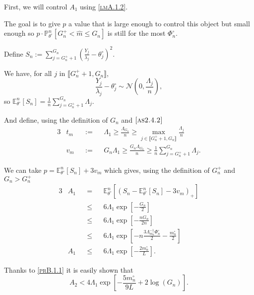 \medskip

First, we will control $A_{1}$ using \textsc{\cref{lmA.1.2}}.

The goal is to give $p$ a value that is large enough to control this object but small enough so $p \cdot \mathds{P}_{\theta^{\circ}}^{n} \left[G_{n}^{+} < \widehat{m} \leq G_{n}\right]$ is still for the most $\Phi_{n}^{\circ}$.

Define $S_{n} := \sum\limits_{j = G_{n}^{+} + 1}^{G_{n}}\left(\frac{Y_{j}}{\lambda_{j}} - \theta^{\circ}_{j}\right)^{2}.$

We have, for all $j$ in $\llbracket G_{n}^{+} + 1, G_{n} \rrbracket$,
\[ \frac{Y_{j}}{\lambda_{j}} - \theta^{\circ}_{j} \sim \mathcal{N}\left(0, \frac{\Lambda_{j}}{n} \right), \]
so $\mathds{E}_{\theta^{\circ}}^{n}\left[S_{n}\right] = \frac{1}{n} \sum\limits_{j = G_{n}^{+} + 1}^{G_{n}} \Lambda_{j}$.

And define, using the definition of $G_{n}$ and $\textsc{\cref{as2.4.2}}$
\begin{alignat*}{3}
& t_{m} &&:=&& \Lambda_{1} \geq \frac{\Lambda_{G_{n}}}{n} \geq \max\limits_{j \in \llbracket G_{n}^{+} + 1, G_{n} \rrbracket} \frac{\Lambda_{j}}{n}\\
& v_{m} && := && G_{n} \Lambda_{1} \geq \frac{G_{n} \Lambda_{G_{n}}}{n} \geq  \frac{1}{n} \sum\limits_{j = G_{n}^{+} + 1}^{G_{n}} \Lambda_{j}.
\end{alignat*}

We can take $p = \mathds{E}_{\theta^{\circ}}^{n}\left[S_{n}\right] + 3 v_{m}$ which gives, using the definition of $G_{n}^{+}$ and $G_{n} > G_{n}^{+}$
\begin{alignat*}{3}
& A_{1} && = && \mathds{E}_{\theta^{\circ}}^{n}\left[\left(S_{n} - \mathds{E}_{\theta^{\circ}}^{n}\left[S_{n}\right] - 3 v_{m}\right)_{+}\right]\\
& &&\leq&& 6 \Lambda_{1} \exp\left[- \frac{G_{n}}{2}\right]\\
& &&\leq&& 6 \Lambda_{1} \exp\left[- \frac{n G_{n}}{2n}\right]\\
& &&\leq&& 6 \Lambda_{1} \exp\left[- n \frac{3 \Lambda_{m_{n}^{\circ}}^{-1} \Phi_{n}^{\circ}}{2} - \frac{m_{n}^{\circ}}{2}\right]\\
& A_{1} && \leq && 6 \Lambda_{1} \exp\left[- \frac{2 m_{n}^{\circ}}{L}\right].
\end{alignat*}

\medskip

Thanks to \textsc{\cref{prB.1.1}} it is easily shown that
\[A_{2} < 4 \Lambda_{1} \exp\left[-\frac{5 m_{n}^{\circ}}{9 L} + 2 \log \left(G_{n}\right)\right].\]

